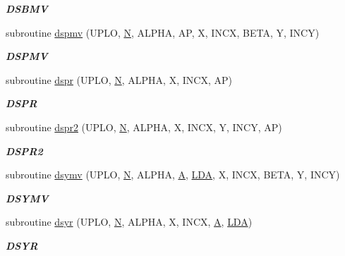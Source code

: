 \begin{DoxyCompactItemize}
\begin{DoxyCompactList}\small\item\em {\bfseries D\+S\+B\+M\+V} \end{DoxyCompactList}\item 
subroutine \hyperlink{group__double__blas__level2_gab746575c4f7dd4eec72e8110d42cefe9}{dspmv} (U\+P\+L\+O, \hyperlink{polmisc_8c_a0240ac851181b84ac374872dc5434ee4}{N}, A\+L\+P\+H\+A, A\+P, X, I\+N\+C\+X, B\+E\+T\+A, Y, I\+N\+C\+Y)
\begin{DoxyCompactList}\small\item\em {\bfseries D\+S\+P\+M\+V} \end{DoxyCompactList}\item 
subroutine \hyperlink{group__double__blas__level2_ga22adb497a4f41eabc6a8dcac6f326183}{dspr} (U\+P\+L\+O, \hyperlink{polmisc_8c_a0240ac851181b84ac374872dc5434ee4}{N}, A\+L\+P\+H\+A, X, I\+N\+C\+X, A\+P)
\begin{DoxyCompactList}\small\item\em {\bfseries D\+S\+P\+R} \end{DoxyCompactList}\item 
subroutine \hyperlink{group__double__blas__level2_ga16318e7e16083b395bd959b0cc93e803}{dspr2} (U\+P\+L\+O, \hyperlink{polmisc_8c_a0240ac851181b84ac374872dc5434ee4}{N}, A\+L\+P\+H\+A, X, I\+N\+C\+X, Y, I\+N\+C\+Y, A\+P)
\begin{DoxyCompactList}\small\item\em {\bfseries D\+S\+P\+R2} \end{DoxyCompactList}\item 
subroutine \hyperlink{group__double__blas__level2_ga6ab49c8fa5e2608d9545483045bf3d03}{dsymv} (U\+P\+L\+O, \hyperlink{polmisc_8c_a0240ac851181b84ac374872dc5434ee4}{N}, A\+L\+P\+H\+A, \hyperlink{classA}{A}, \hyperlink{example__user_8c_ae946da542ce0db94dced19b2ecefd1aa}{L\+D\+A}, X, I\+N\+C\+X, B\+E\+T\+A, Y, I\+N\+C\+Y)
\begin{DoxyCompactList}\small\item\em {\bfseries D\+S\+Y\+M\+V} \end{DoxyCompactList}\item 
subroutine \hyperlink{group__double__blas__level2_ga35ca25bb135cd7bfdd5d6190b1aa4d07}{dsyr} (U\+P\+L\+O, \hyperlink{polmisc_8c_a0240ac851181b84ac374872dc5434ee4}{N}, A\+L\+P\+H\+A, X, I\+N\+C\+X, \hyperlink{classA}{A}, \hyperlink{example__user_8c_ae946da542ce0db94dced19b2ecefd1aa}{L\+D\+A})
\begin{DoxyCompactList}\small\item\em {\bfseries D\+S\+Y\+R} \end{DoxyCompactList}\item 

\end{DoxyCompactItemize}
